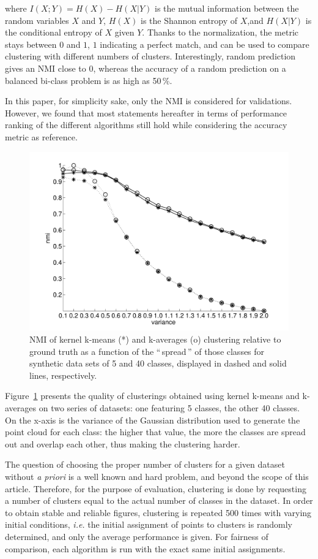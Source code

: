 \documentclass[natbib,smallextended]{svjour3}
\newcommand{\gl}[1]{``\,#1\,''} %
\begin{document}
where $I(X;Y)=H(X)−H(X|Y)$ is the mutual information between the random variables $X$ and $Y$, $H(X)$ is the Shannon entropy of $X$,and $H(X|Y)$ is the conditional entropy of $X$ given $Y$. Thanks to the normalization, the metric stays between $0$ and $1$, $1$ indicating a perfect match, and can be used to compare clustering with different numbers of clusters. Interestingly, random prediction gives an NMI close to $0$, whereas the accuracy of a random prediction on a balanced bi-class problem is as high as 50\,\%.

In this paper, for simplicity sake, only the NMI is considered for validations. However, we found that most statements hereafter in terms of performance ranking of the different algorithms still hold while considering the accuracy metric as reference.

\begin{figure}
\center
\includegraphics[width=.7\textwidth]{figures/synthetic.pdf}
\caption{NMI of kernel k-means (*) and k-averages (o) clustering relative to ground truth as a function of the \gl{spread} of those classes for synthetic data sets of 5 and 40 classes, displayed in dashed and solid lines, respectively.}
\label{fig:synth_perf}
\end{figure}

Figure~\ref{fig:synth_perf} presents the quality of clusterings obtained using kernel k-means and k-averages on two series of datasets: one featuring 5 classes, the other 40 classes. On the x-axis is the variance of the Gaussian distribution used to generate the point cloud for each class: the higher that value, the more the classes are spread out and overlap each other, thus making the clustering harder.

The question of choosing the proper number of clusters for a given dataset without \textit{a priori} is a well known and hard problem, and beyond the scope of this article. Therefore, for the purpose of evaluation, clustering is done by requesting a number of clusters equal to the actual number of classes in the dataset. In order to obtain stable and reliable figures, clustering is repeated 500 times with varying initial conditions, \textit{i.e.} the initial assignment of points to clusters is randomly determined, and only the average performance is given. For fairness of comparison, each algorithm is run with the exact same initial assignments.
\end{document}
